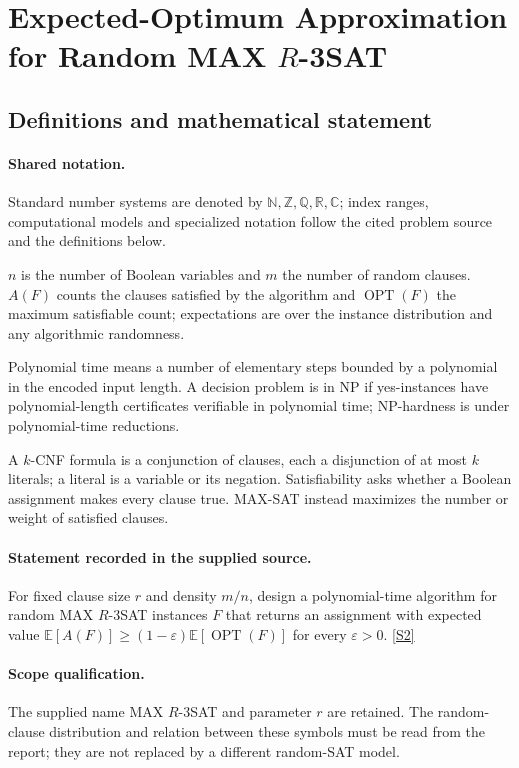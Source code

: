 \documentclass[11pt]{article}
\newcommand{\sref}[2]{\hyperlink{source:#1:#2}{[S#2]}}
\begin{document}
\section{Expected-Optimum Approximation for Random MAX $R$-3SAT}\label{statement}

\subsection{Definitions and mathematical statement}

\paragraph{Shared notation.}Standard number systems are denoted by $\mathbb N,\mathbb Z,\mathbb Q,\mathbb R,\mathbb C$; index ranges, computational models and specialized notation follow the cited problem source and the definitions below.


$n$ is the number of Boolean variables and $m$ the number of random clauses. $A(F)$ counts the clauses satisfied by the algorithm and $\operatorname{OPT}(F)$ the maximum satisfiable count; expectations are over the instance distribution and any algorithmic randomness.

Polynomial time means a number of elementary steps bounded by a polynomial in the encoded input length. A decision problem is in $\mathrm{NP}$ if yes-instances have polynomial-length certificates verifiable in polynomial time; NP-hardness is under polynomial-time reductions.

A $k$-CNF formula is a conjunction of clauses, each a disjunction of at most $k$ literals; a literal is a variable or its negation. Satisfiability asks whether a Boolean assignment makes every clause true. MAX-SAT instead maximizes the number or weight of satisfied clauses.
\paragraph{Statement recorded in the supplied source.}
For fixed clause size $r$ and density $m/n$, design a polynomial-time algorithm for random MAX $R$-3SAT instances $F$ that returns an assignment with expected value $\mathbb{E}[A(F)]\geq(1-\varepsilon)\mathbb{E}[\operatorname{OPT}(F)]$ for every $\varepsilon>0$. \sref{statement}{2}
\paragraph{Scope qualification.}
The supplied name MAX $R$-3SAT and parameter $r$ are retained. The random-clause distribution and relation between these symbols must be read from the report; they are not replaced by a different random-SAT model.
\end{document}
